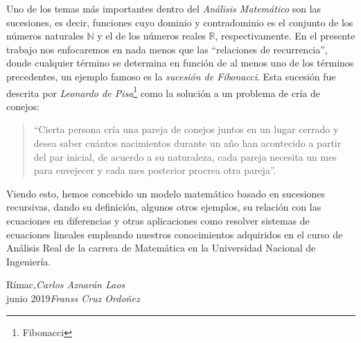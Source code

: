 \preface
Uno de los temas más importantes dentro del \emph{Análisis Matemático} son las sucesiones, es decir, funciones cuyo dominio y contradominio es el conjunto de los números naturales $\mathds{N}$ y el de los números reales $\mathds{R}$, respectivamente. En el presente trabajo nos enfocaremos en nada menos que las ``relaciones de recurrencia'', donde cualquier  término se determina en función de al menos uno de los términos precedentes, un ejemplo famoso es la \emph{sucesión de Fibonacci}. Esta sucesión fue descrita por \emph{Leonardo de Pisa}\footnote{Fibonacci} como la solución a un problema de cría de conejos:
\begin{quote}
	``Cierta persona cría una pareja de conejos juntos en un lugar cerrado y desea saber cuántos nacimientos durante un año han acontecido a partir del par inicial, de acuerdo a su naturaleza, cada pareja necesita un mes para envejecer y cada mes posterior procrea otra pareja''.
\end{quote}
Viendo esto, hemos concebido un modelo matemático basado en sucesiones recursivas, dando su definición, algunos otros ejemplos, su relación con las ecuaciones en diferencias y otras aplicaciones como resolver sistemas de ecuaciones lineales empleando nuestros conocimientos adquiridos en el curso de Análisis Real de la carrera de Matemática en la Universidad
Nacional de Ingeniería.
\vspace{\baselineskip}
\begin{flushright}\noindent
Rímac,\hfill {\it Carlos Aznarán Laos}\\
junio 2019\hfill {\it Franss Cruz Ordoñez}\\
\end{flushright}